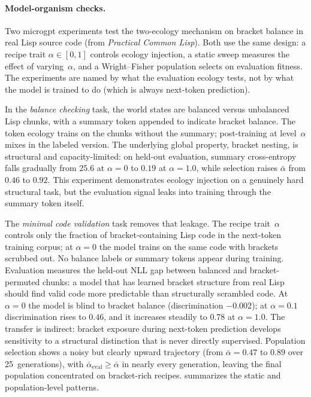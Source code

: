 \documentclass[twoside,11pt]{article}
\begin{document}
\paragraph{Model-organism checks.}
Two microgpt experiments test the two-ecology mechanism on bracket balance in real Lisp source code (from \emph{Practical Common Lisp}). Both use the same design: a recipe trait $\alpha\in[0,1]$ controls ecology injection, a static sweep measures the effect of varying~$\alpha$, and a Wright--Fisher population selects on evaluation fitness. The experiments are named by what the evaluation ecology tests, not by what the model is trained to do (which is always next-token prediction).

In the \emph{balance checking} task, the world states are balanced versus unbalanced Lisp chunks, with a summary token appended to indicate bracket balance. The token ecology trains on the chunks without the summary; post-training at level~$\alpha$ mixes in the labeled version. The underlying global property, bracket nesting, is structural and capacity-limited: on held-out evaluation, summary cross-entropy falls gradually from $25.6$ at $\alpha=0$ to $0.19$ at $\alpha=1.0$, while selection raises $\bar{\alpha}$ from $0.46$ to $0.92$. This experiment demonstrates ecology injection on a genuinely hard structural task, but the evaluation signal leaks into training through the summary token itself.

The \emph{minimal code validation} task removes that leakage. The recipe trait~$\alpha$ controls only the fraction of bracket-containing Lisp code in the next-token training corpus; at $\alpha=0$ the model trains on the same code with brackets scrubbed out. No balance labels or summary tokens appear during training. Evaluation measures the held-out NLL gap between balanced and bracket-permuted chunks: a model that has learned bracket structure from real Lisp should find valid code more predictable than structurally scrambled code. At $\alpha=0$ the model is blind to bracket balance (discrimination $-0.002$); at $\alpha=0.1$ discrimination rises to $0.46$, and it increases steadily to $0.78$ at $\alpha=1.0$. The transfer is indirect: bracket exposure during next-token prediction develops sensitivity to a structural distinction that is never directly supervised. Population selection shows a noisy but clearly upward trajectory (from $\bar{\alpha}=0.47$ to $0.89$ over 25~generations), with $\bar{\alpha}_{\mathrm{eval}} \ge \bar{\alpha}$ in nearly every generation, leaving the final population concentrated on bracket-rich recipes.  summarizes the static and population-level patterns.
\end{document}
